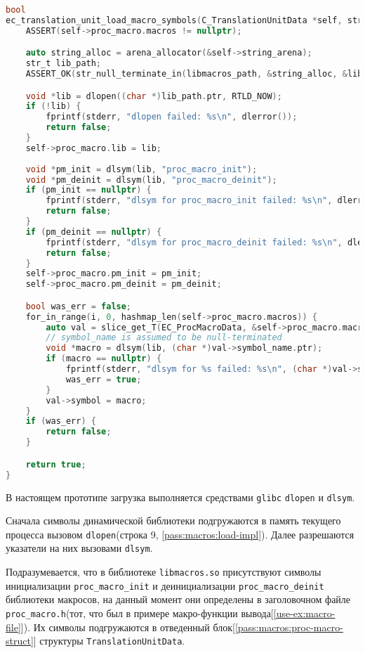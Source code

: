 \begin{lstlisting}[language=c, caption={Реализация функции загрузки макросов}, label={pass:macros:load-impl}]
bool
ec_translation_unit_load_macro_symbols(C_TranslationUnitData *self, str_t libmacros_path) {
    ASSERT(self->proc_macro.macros != nullptr);

    auto string_alloc = arena_allocator(&self->string_arena);
    str_t lib_path;
    ASSERT_OK(str_null_terminate_in(libmacros_path, &string_alloc, &lib_path));

    void *lib = dlopen((char *)lib_path.ptr, RTLD_NOW);
    if (!lib) {
        fprintf(stderr, "dlopen failed: %s\n", dlerror());
        return false;
    }
    self->proc_macro.lib = lib;
    
    void *pm_init = dlsym(lib, "proc_macro_init");
    void *pm_deinit = dlsym(lib, "proc_macro_deinit");
    if (pm_init == nullptr) {
        fprintf(stderr, "dlsym for proc_macro_init failed: %s\n", dlerror());
        return false;
    }
    if (pm_deinit == nullptr) {
        fprintf(stderr, "dlsym for proc_macro_deinit failed: %s\n", dlerror());
        return false;
    }
    self->proc_macro.pm_init = pm_init;
    self->proc_macro.pm_deinit = pm_deinit;

    bool was_err = false;
    for_in_range(i, 0, hashmap_len(self->proc_macro.macros)) {
        auto val = slice_get_T(EC_ProcMacroData, &self->proc_macro.macros->values, i);
        // symbol_name is assumed to be null-terminated
        void *macro = dlsym(lib, (char *)val->symbol_name.ptr);
        if (macro == nullptr) {
            fprintf(stderr, "dlsym for %s failed: %s\n", (char *)val->symbol_name.ptr, dlerror());
            was_err = true;
        }
        val->symbol = macro;
    }
    if (was_err) {
        return false;
    }

    return true;
}
\end{lstlisting}

В настоящем прототипе загрузка выполняется средствами \verb|glibc| \verb|dlopen| и \verb|dlsym|.

Сначала символы динамической библиотеки подгружаются в память текущего процесса вызовом \verb|dlopen|(строка 9, \ref{pass:macros:load-impl}).
Далее разрешаются указатели на них вызовами \verb|dlsym|.

Подразумевается, что в библиотеке \verb|libmacros.so| присутствуют символы инициализации \verb|proc_macro_init| и деинициализации \verb|proc_macro_deinit| библиотеки макросов, 
на данный момент они определены в заголовочном файле \verb|proc_macro.h|(тот, что был в примере макро-функции вывода[\ref{use-ex:macro-file}]).
Их символы подгружаются в отведенный блок[\ref{pass:macros:proc-macro-struct}] структуры \verb|TranslationUnitData|.

